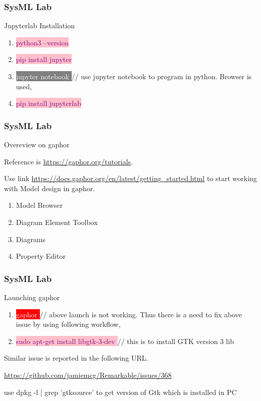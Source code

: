 \newpage
\begin{frame}
\frametitle{SysML Lab}
\begin{block}{Jupyterlab Installation }
\begin{enumerate}
\item    \colorbox{pink}{ \textcolor{purple}{python3 --version  } }
\item    \colorbox{pink}{ \textcolor{purple}{pip install jupyter  } }
\item    \colorbox{gray}{ \textcolor{white}{jupyter notebook  } }
// use jupyter notebook to program in python. Browser is used,
\item    \colorbox{pink}{ \textcolor{purple}{pip install jupyterlab  } }
\end{enumerate}
\end{block}
\end{frame}


\newpage
\begin{frame}
\frametitle{SysML Lab}
\begin{block}{ Overeview on gaphor }

Reference is \url{https://gaphor.org/tutorials}. 

Use link \url{https://docs.gaphor.org/en/latest/getting_started.html}  to start 
working with Model design in gaphor.

\begin{enumerate}
\item  Model Browser
\item Diagram Element Toolbox
\item  Diagrams
\item Property Editor
\end{enumerate}

 \end{block}
\end{frame}

    
\newpage
\begin{frame}
\frametitle{SysML Lab}
\begin{block}{Launching gaphor }
\begin{enumerate}
\item    \colorbox{red}{ \textcolor{white}{gaphor  } } 
// above launch  is not working. Thus there is a need to fix above issue by using following workflow, 

\item    \colorbox{pink}{ \textcolor{purple}{ sudo apt-get install libgtk-3-dev } } 
// this is to install GTK version 3 lib 
\end{enumerate}

Similar issue is reported in the following URL.

\url{https://github.com/jamiemcg/Remarkable/issues/368}

\vspace{1cm}
use dpkg -l | grep 'gtksource'  to get version of Gtk which is installed in PC

\end{block}
\end{frame}
\newpage 

